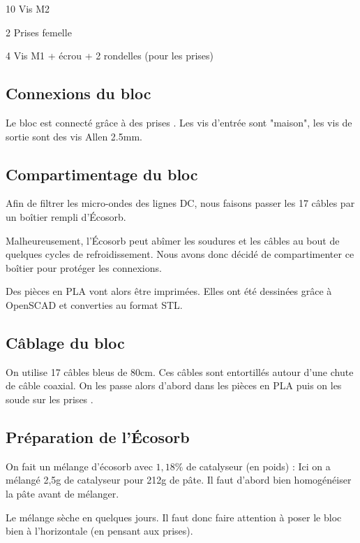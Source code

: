 

\begin{BOM}
    \item 10 \fois Vis M2
    \item 2 \fois Prises \uD femelle
    \item 4 \fois Vis M1 + écrou + 2 rondelles (pour les prises)
    \item \fois 
\end{BOM}


\subsection{Connexions du bloc}
Le bloc est connecté grâce à des prises \uD. Les vis d'entrée sont "maison", les vis de sortie sont des vis Allen 2.5mm.

\subsection{Compartimentage du bloc}
Afin de filtrer les micro-ondes des lignes DC, nous faisons passer les 17 câbles par un boîtier rempli d'Écosorb.

Malheureusement, l'Écosorb peut abîmer les soudures et les câbles au bout de quelques cycles de refroidissement. Nous avons donc décidé de compartimenter ce boîtier pour protéger les connexions.

Des pièces en PLA vont alors être imprimées. Elles ont été dessinées grâce à OpenSCAD et converties au format STL.

\subsection{Câblage du bloc}
On utilise 17 câbles bleus de 80cm. Ces câbles sont entortillés autour d'une chute de câble coaxial. On les passe alors d'abord dans les pièces en PLA puis on les soude sur les prises \uD.

\subsection{Préparation de l'Écosorb}
On fait un mélange d'écosorb avec $1,18\%$ de catalyseur (en poids) : Ici on a mélangé 2,5g de catalyseur pour 212g de pâte. Il faut d'abord bien homogénéiser la pâte avant de mélanger.

Le mélange sèche en quelques jours. Il faut donc faire attention à poser le bloc bien à l'horizontale (en pensant aux prises).
